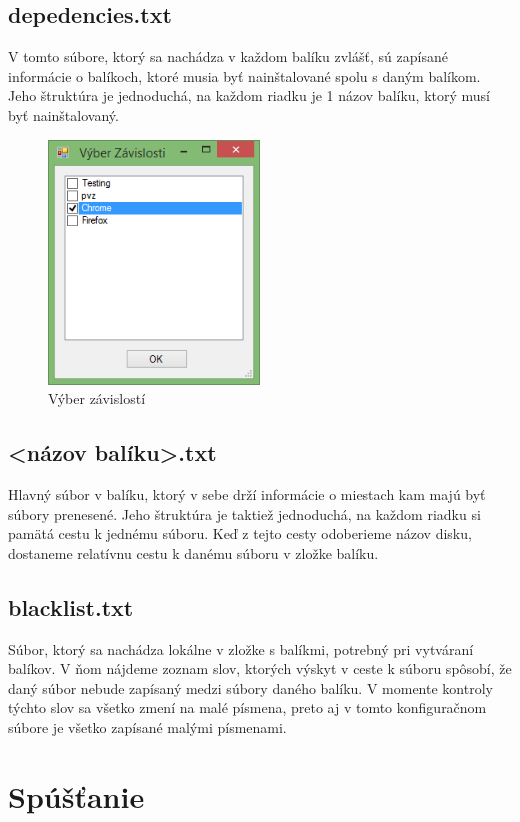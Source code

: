 \subsection{depedencies.txt}
V tomto súbore, ktorý sa nachádza v každom balíku zvlášť, sú zapísané informácie o balíkoch, ktoré musia byť nainštalované spolu s daným balíkom. Jeho štruktúra je jednoduchá, na každom riadku je 1 názov balíku, ktorý musí byť nainštalovaný.
\begin{figure}[h]
    \centering
    \includegraphics[width=0.5\textwidth]{depend}
    \caption{Výber závislostí}
    \label{fig:depend}
\end{figure}

\subsection{\textless názov balíku\textgreater.txt}
Hlavný súbor v balíku, ktorý v sebe drží informácie o miestach kam majú byť súbory prenesené. Jeho štruktúra je taktiež jednoduchá, na každom riadku si pamätá cestu k jednému súboru. Keď z tejto cesty odoberieme názov disku, dostaneme relatívnu cestu k danému súboru v zložke balíku.

\subsection{blacklist.txt}
Súbor, ktorý sa nachádza lokálne v zložke s balíkmi, potrebný pri vytváraní balíkov. V ňom nájdeme zoznam slov, ktorých výskyt v ceste k súboru spôsobí, že daný súbor nebude zapísaný medzi súbory daného balíku. V momente kontroly týchto slov sa všetko zmení na malé písmena, preto aj v tomto konfiguračnom súbore je všetko zapísané malými písmenami. 

\section{Spúšťanie}
